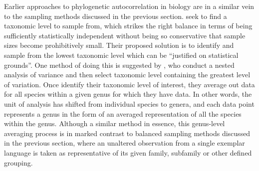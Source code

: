 Earlier approaches to phylogenetic autocorrelation in biology are in a similar vein to the sampling methods discussed in the previous section. \textcite[pp.~346--347]{harvey_comparisons_1982} seek to find a taxonomic level to sample from, which strikes the right balance in terms of being sufficiently statistically independent without being so conservative that sample sizes become prohibitively small. Their proposed solution is to identify and sample from the lowest taxonomic level which can be ``justified on statistical grounds''. One method of doing this is suggested by \textcite[pp.~6--8]{clutton-brock_primate_1977}, who conduct a nested analysis of variance and then select taxonomic level containing the greatest level of variation. Once \textcite{clutton-brock_primate_1977} identify their taxonomic level of interest, they average out data for all species within a given genus for which they have data. In other words, the unit of analysis has shifted from individual species to genera, and each data point represents a genus in the form of an averaged representation of all the species within the genus. Although a similar method in essence, this genus-level averaging process is in marked contrast to balanced sampling methods discussed in the previous section, where an unaltered observation from a single exemplar language is taken as representative of its given family, subfamily or other defined grouping.

